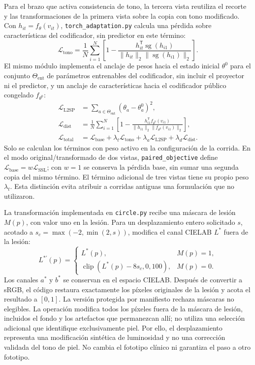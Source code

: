 Para el brazo que activa consistencia de tono, la tercera vista reutiliza el recorte y las transformaciones de la primera vista sobre la copia con tono modificado. Con $h_{it}=f_\theta(v_{it})$, \texttt{torch\_adaptation.py} calcula una pérdida sobre características del codificador, sin predictor en este término:
\begin{equation}
 \mathcal L_{\mathrm{tono}}=\frac{1}{N}\sum_{i=1}^{N}\left[
 1-\frac{h_{it}^{\mathsf T}\operatorname{sg}(h_{i1})}{\|h_{it}\|_2\|\operatorname{sg}(h_{i1})\|_2}\right].
\end{equation}
El mismo módulo implementa el anclaje de pesos hacia el estado inicial $\theta^0$ para el conjunto $\Theta_{\mathrm{ent}}$ de parámetros entrenables del codificador, sin incluir el proyector ni el predictor, y un anclaje de características hacia el codificador público congelado $f_{\theta^0}$:
\begin{align}
 \mathcal L_{\mathrm{L2SP}}&=\sum_{a\in\Theta_{\mathrm{ent}}}(\theta_a-\theta_a^0)^2,\\
 \mathcal L_{\mathrm{dist}}&=\frac{1}{N}\sum_{i=1}^{N}\left[
 1-\frac{h_{i1}^{\mathsf T}f_{\theta^0}(v_{i1})}{\|h_{i1}\|_2\|f_{\theta^0}(v_{i1})\|_2}\right],\\
 \mathcal L_{\mathrm{total}}&=\mathcal L_{\mathrm{base}}+\lambda_t\mathcal L_{\mathrm{tono}}+
 \lambda_a\mathcal L_{\mathrm{L2SP}}+\lambda_d\mathcal L_{\mathrm{dist}}.
\end{align}
Solo se calculan los términos con peso activo en la configuración de la corrida. En el modo original/transformado de dos vistas, \texttt{paired\_objective} define $\mathcal L_{\mathrm{base}}=w\mathcal L_{\mathrm{SSL}}$; con $w=1$ se conserva la pérdida base, sin sumar una segunda copia del mismo término. El término adicional de tres vistas tiene su propio peso $\lambda_t$. Esta distinción evita atribuir a corridas antiguas una formulación que no utilizaron.

La transformación implementada en \texttt{circle.py} recibe una máscara de lesión $M(p)$, con valor uno en la lesión. Para un desplazamiento entero solicitado $s$, acotado a $s_c=\max(-2,\min(2,s))$, modifica el canal CIELAB $L^*$ fuera de la lesión:
\begin{equation}
 L^{*\prime}(p)=\begin{cases}
 L^*(p), & M(p)=1,\\
 \operatorname{clip}(L^*(p)-8s_c,0,100), & M(p)=0.
 \end{cases}
\end{equation}
Los canales $a^*$ y $b^*$ se conservan en el espacio CIELAB. Después de convertir a sRGB, el código restaura exactamente los píxeles originales de la lesión y acota el resultado a $[0,1]$. La versión protegida por manifiesto rechaza máscaras no elegibles. La operación modifica todos los píxeles fuera de la máscara de lesión, incluidos el fondo y los artefactos que permanezcan allí; no utiliza una selección adicional que identifique exclusivamente piel. Por ello, el desplazamiento representa una modificación sintética de luminosidad y no una corrección validada del tono de piel. No cambia el fototipo clínico ni garantiza el paso a otro fototipo.

